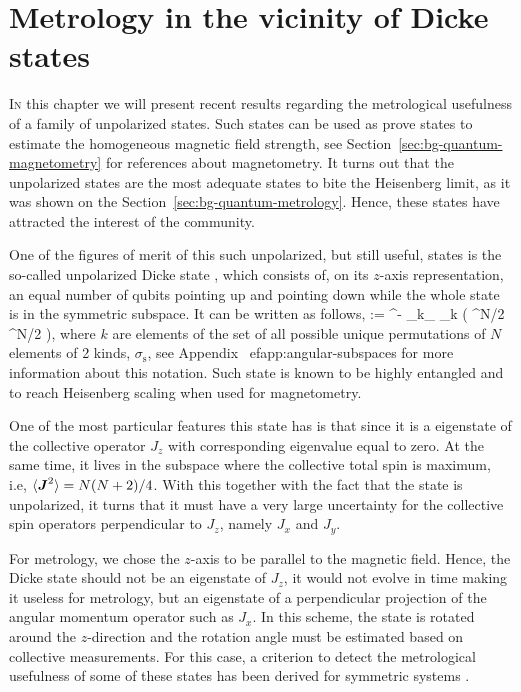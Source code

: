 \section{Metrology in the vicinity of Dicke states}
\label{sec:vd}



\lettrine[lines=2, findent=3pt,nindent=0pt]{I}{n} this chapter we will present recent results regarding the metrological usefulness of a family of unpolarized states.
Such states can be used as prove states to estimate the homogeneous magnetic field strength, see Section~\ref{sec:bg-quantum-magnetometry} for references about magnetometry.
It turns out that the unpolarized states are the most adequate states to bite the Heisenberg limit, as it was shown on the Section~\ref{sec:bg-quantum-metrology}.
Hence, these states have attracted the interest of the community.

One of the figures of merit of this such unpolarized, but still useful, states is the so-called unpolarized Dicke state \cite{Dicke1954}, which consists of, on its $z$-axis  representation, an equal number of qubits pointing up and pointing down while the whole state is in the symmetric subspace.
It can be written as follows,
\be
   \equiv {}:= ^{-}
  \sum_{k\in \sigma_}
  _{k} \left( ^{\otimes N/2} ^{\otimes N/2}
  \right),
  \label{eq:vd-unpolarised-dicke}
\ee
where $k$ are elements of the set of all possible unique permutations of $N$ elements of 2 kinds, $\sigma_\text{s}$, see Appendix~
ef{app:angular-subspaces} for more information about this notation.
Such state is known to be highly entangled \cite{} and to reach Heisenberg scaling when used for magnetometry.

One of the most particular features this state has is that since it is a eigenstate of the collective operator $J_z$ with corresponding eigenvalue equal to zero.
At the same time, it lives in the subspace where the collective total spin is maximum, i.e, $\langle \boldsymbol{J}^2 \rangle=N(N+2)/4$.
With this together with the fact that the state is unpolarized, it turns that it must have a very large uncertainty for the collective spin operators perpendicular to $J_z$, namely $J_x$ and $J_y$.

For metrology, we chose the $z$-axis to be parallel to the magnetic field.
Hence, the Dicke state should not be an eigenstate of $J_z$, it would not evolve in time making it useless for metrology, but an eigenstate of a perpendicular projection of the angular momentum operator such as $J_x$.
In this scheme, the state is rotated around the $z$-direction and the rotation angle must be estimated based on collective measurements.
For this case, a criterion to detect the metrological usefulness of some of these states has been derived for symmetric systems \cite{VD51}.

